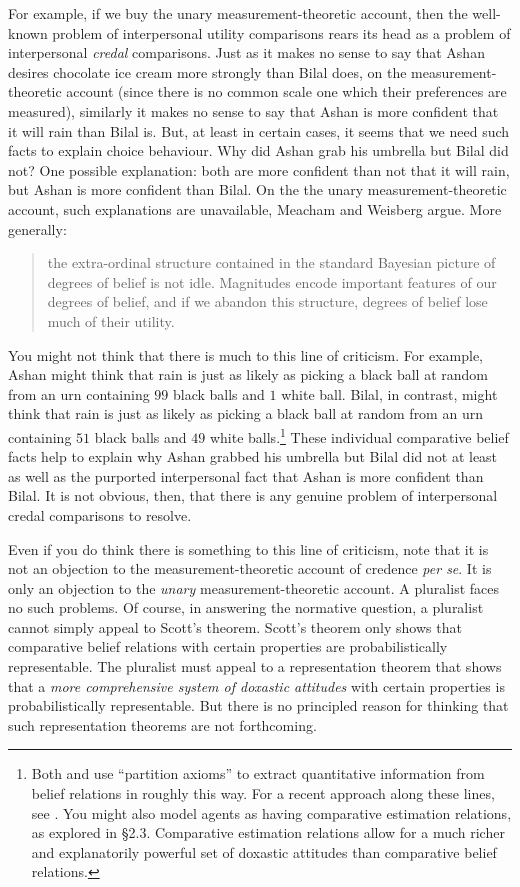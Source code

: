 For example, if we buy the unary measurement-theoretic account, then the well-known problem of interpersonal utility comparisons rears its head as a problem of interpersonal \textit{credal} comparisons. Just as it makes no sense to say that Ashan desires chocolate ice cream more strongly than Bilal does, on the measurement-theoretic account (since there is no common scale one which their preferences are measured), similarly it makes no sense to say that Ashan is more confident that it will rain than Bilal is. But, at least in certain cases, it seems that we need such facts to explain choice behaviour. Why did Ashan grab his umbrella but Bilal did not? One possible explanation: both are more confident than not that it will rain, but Ashan is more confident than Bilal. On the the unary measurement-theoretic account, such explanations are unavailable, Meacham and Weisberg argue. More generally:
\begin{quote}
the extra-ordinal structure contained in the standard Bayesian picture of degrees of belief is not idle. Magnitudes encode important features of our degrees of belief, and if we abandon this structure, degrees of belief lose much of their utility. \citep[p. 20]{Meacham2011}
\end{quote}


You might not think that there is much to this line of criticism. For example, Ashan might think that rain is just as likely as picking a black ball at random from an urn containing $99$ black balls and $1$ white ball. Bilal, in contrast, might think that rain is just as likely as picking a black ball at random from an urn containing $51$ black balls and $49$ white balls.\footnote{Both \citet{deFinetti1931} and \citet{Koopman1940b} use ``partition axioms'' to extract quantitative information from belief relations in roughly this way. For a recent approach along these lines, see \citet{Elliott2018}. You might also model agents as having comparative estimation relations, as explored in \S2.3. Comparative estimation relations allow for a much richer and explanatorily powerful set of doxastic attitudes than comparative belief relations.} These individual comparative belief facts help to explain why Ashan grabbed his umbrella but Bilal did not at least as well as the purported interpersonal fact that Ashan is more confident than Bilal. It is not obvious, then, that there is any genuine problem of interpersonal credal comparisons to resolve.

Even if you do think there is something to this line of criticism, note that it is not an objection to the measurement-theoretic account of credence \textit{per se}. It is only an objection to the \textit{unary} measurement-theoretic account. A pluralist faces no such problems. Of course, in answering the normative question, a pluralist cannot simply appeal to Scott's theorem. Scott's theorem only shows that comparative belief relations with certain properties are probabilistically representable. The pluralist must appeal to a representation theorem that shows that a \textit{more comprehensive system of doxastic attitudes} with certain properties is probabilistically representable. But there is no principled reason for thinking that such representation theorems are not forthcoming. 



